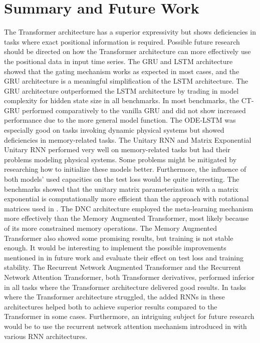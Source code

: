 \documentclass[draft,final]{vutinfth} %
\begin{document}
    \chapter{Summary and Future Work}
    The Transformer architecture has a superior expressivity but shows deficiencies in tasks where exact positional information is required.
    Possible future research should be directed on how the Transformer architecture can more effectively use the positional data in input time series.
    The GRU and LSTM architecture showed that the gating mechanism works as expected in most cases, and the GRU architecture is a meaningful simplification of the LSTM architecture.
    The GRU architecture outperformed the LSTM architecture by trading in model complexity for hidden state size in all benchmarks.
    In most benchmarks, the CT-GRU performed comparatively to the vanilla GRU and did not show increased performance due to the more general model function.
    The ODE-LSTM was especially good on tasks invoking dynamic physical systems but showed deficiencies in memory-related tasks.
    The Unitary RNN and Matrix Exponential Unitary RNN performed very well on memory-related tasks but had their problems modeling physical systems.
    Some problems might be mitigated by researching how to initialize these models better.
    Furthermore, the influence of both models' used capacities on the test loss would be quite interesting.
    The benchmarks showed that the unitary matrix parameterization with a matrix exponential is computationally more efficient than the approach with rotational matrices used in \cite{EfficientUnitaryRNNs}.
    The DNC architecture employed the meta-learning mechanism more effectively than the Memory Augmented Transformer, most likely because of its more constrained memory operations.
    The Memory Augmented Transformer also showed some promising results, but training is not stable enough.
    It would be interesting to implement the possible improvements mentioned in  in future work and evaluate their effect on test loss and training stability.
    The Recurrent Network Augmented Transformer and the Recurrent Network Attention Transformer, both Transformer derivatives, performed inferior in all tasks where the Transformer architecture delivered good results.
    In tasks where the Transformer architecture struggled, the added RNNs in these architectures helped both to achieve superior results compared to the Transformer in some cases.
    Furthermore, an intriguing subject for future research would be to use the recurrent network attention mechanism introduced in  with various RNN architectures.
\end{document}
